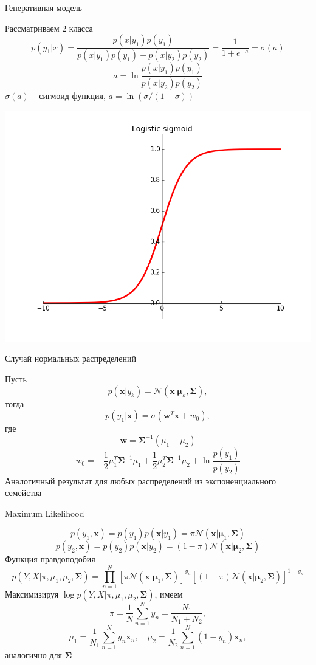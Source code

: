 \documentclass[10pt]{beamer}
\begin{document}
\begin{frame}{Генеративная модель}

Рассматриваем 2 класса
\[
p(y_1 | x) = \frac{p(x | y_1) p(y_1)}{p(x | y_1) p(y_1) + p(x | y_2) p(y_2)} = \frac{1}{1 + e^{-a}} = \sigma(a)
\]
\[
a = \ln \frac{p(x | y_1)p(y_1)}{p(x | y_2)p(y_2)}
\]
$\sigma(a)$ -- сигмоид-функция, $a = \ln (\sigma/(1-\sigma))$

\begin{center}
\includegraphics[scale=0.28]{images/sigmoid.png}
\end{center}

\end{frame}

\begin{frame}{Случай нормальных распределений}

Пусть 
\[
p(\mathbf{x} | y_k) = \mathcal{N}(\mathbf{x} | \mathbf{\mu}_k, \mathbf{\Sigma}),
\]
тогда
\[
p(y_1 | \mathbf{x}) = \sigma(\mathbf{w}^T \mathbf{x} + w_0),
\]
где
\[
\mathbf{w} = \mathbf{\Sigma}^{-1} (\mu_1 - \mu_2)
\]
\[
w_0 = - \frac 1 2 \mu_1^T \mathbf{\Sigma}^{-1} \mu_1 + \frac 1 2 \mu_2^T \mathbf{\Sigma}^{-1} \mu_2 + \ln \frac{p(y_1)}{p(y_2)}
\]
Аналогичный результат для любых распределений из экспоненциального семейства

\end{frame}

\begin{frame}{Maximum Likelihood}

\[
p(y_1, \mathbf{x}) = p(y_1) p(\mathbf{x} | y_1) = \pi \mathcal{N}(\mathbf{x} | \mathbf{\mu}_1, \mathbf{\Sigma})
\]
\[
p(y_2, \mathbf{x}) = p(y_2) p(\mathbf{x} | y_2) = (1 - \pi) \mathcal{N}(\mathbf{x} | \mathbf{\mu}_2, \mathbf{\Sigma})
\]
Функция правдоподобия
\[
p(Y, X | \pi, \mu_1, \mu_2, \mathbf{\Sigma}) = \prod_{n=1}^N \left[ \pi \mathcal{N}(\mathbf{x} | \mathbf{\mu}_1, \mathbf{\Sigma}) \right]^{y_n} \left[ (1 - \pi) \mathcal{N}(\mathbf{x} | \mathbf{\mu}_2, \mathbf{\Sigma}) \right]^{1 - y_n} 
\]
Максимизируя $\log p(Y, X | \pi, \mu_1, \mu_2, \mathbf{\Sigma})$, имеем
\[
\pi = \frac 1 N \sum_{n=1}^N y_n = \frac{N_1}{N_1 + N_2},
\]
\[
\mu_1 = \frac{1}{N_1} \sum_{n=1}^N y_n \mathbf{x}_n, \quad
\mu_2 = \frac{1}{N_2} \sum_{n=1}^N (1 - y_n) \mathbf{x}_n,
\]
аналогично для $\mathbf{\Sigma}$

\end{frame}
\end{document}
